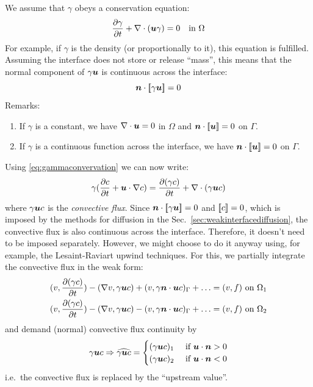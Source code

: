 We assume that $\gamma$ obeys a conservation equation:
\begin{equation}
    \dfrac{\partial \gamma}{\partial t} + \nabla \cdot(\boldsymbol{u} \gamma) = 0 \quad\text{in }\Omega
   \label{eq:gammaconvervation}
\end{equation}
For example, if $\gamma$ is the density (or proportionally to it), this
equation is fulfilled. Assuming the interface does not store or release
``mass'', this means that the normal component of $\gamma\boldsymbol{u}$ is continuous
 across the interface:
\begin{equation}
  \boldsymbol{n}\cdot \text{[\![} \gamma\boldsymbol{u}\text{]\!]} = 0
  \label{eq:massfluxcontinuity}
\end{equation}
Remarks:
\begin{enumerate}
  \item If $\gamma$ is a constant, we have $\nabla\cdot\boldsymbol{u}=0$ in $\Omega$
 and $\boldsymbol{n}\cdot \text{[\![}\boldsymbol{u}\text{]\!]} = 0$ on $\Gamma$. 
  \item If $\gamma$ is a continuous function across the interface, we have
$\boldsymbol{n}\cdot \text{[\![}\boldsymbol{u}\text{]\!]} = 0$ on $\Gamma$.
\end{enumerate}

Using \eqref{eq:gammaconvervation} 
we can now write:
\begin{equation}
    \gamma(\dfrac{\partial c}{\partial t} + \boldsymbol{u}\cdot\nabla c) =
    \dfrac{\partial (\gamma c)}{\partial t} + \nabla \cdot(\gamma \boldsymbol{u} c)
   \label{eq:cconverservation}
\end{equation}
where $\gamma \boldsymbol{u} c$ is the \emph{convective flux}. Since 
$\boldsymbol{n}\cdot \text{[\![} \gamma\boldsymbol{u}\text{]\!]} = 0$ and $\text{[\![} c\text{]\!]}=0$, which is imposed by the
methods for diffusion in the Sec.~\ref{sec:weakinterfacediffusion}, the
convective flux is also continuous across the interface. Therefore, it doesn't
need to be imposed separately. However, we might choose to do it anyway using,
for example, the Lesaint-Raviart upwind techniques. For this, we partially
integrate the convective flux in the weak form:
\begin{align}
   (v,\dfrac{\partial (\gamma c)}{\partial t})-(\nabla v,\gamma\boldsymbol{u} c)+
              (v,\gamma \boldsymbol{n}\cdot\boldsymbol{u} c)_\Gamma+\ldots
              &=(v,f)\text{ on }\Omega_1
   \label{eq:openconvection1}\\
   (v,\dfrac{\partial (\gamma c)}{\partial t})-(\nabla v,\gamma\boldsymbol{u} c)-
              (v,\gamma \boldsymbol{n}\cdot\boldsymbol{u} c)_\Gamma+\ldots
              &=(v,f)\text{ on }\Omega_2
   \label{eq:openconvection2}
\end{align}
and demand (normal) convective flux continuity by
\begin{equation}
   \gamma\boldsymbol{u} c\Rightarrow \widehat{\gamma\boldsymbol{u} c}=
\begin{cases}
(\gamma \boldsymbol{u} c)_1&\text{ if }\boldsymbol{u}\cdot\boldsymbol{n}>0\\
(\gamma \boldsymbol{u} c)_2&\text{ if }\boldsymbol{u}\cdot\boldsymbol{n}<0
\end{cases}
\label{eq:upwinding}
\end{equation}
i.e.\ the convective flux is replaced by the ``upstream value''.

